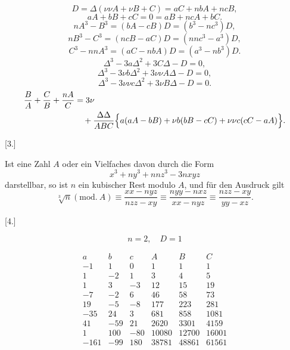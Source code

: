 \[
D = \Delta(\nu\nu A+\nu B+C) = aC+nbA+ncB,
\]
\[
aA+bB+cC = 0 = aB+ncA+bC.
\]
\[
nA^3-B^3 = (bA-cB)D = (b^3-nc^3)D,
\]
\[
nB^3-C^3 = (ncB-aC)D = (nnc^3-a^3)D,
\]
\[
C^3-nnA^3 = (aC-nbA)D = (a^3-nb^3)D.
\]
\[
\Delta^3-3a\Delta^2+3C\Delta-D = 0,
\]
\[
\Delta^3-3\nu b\Delta^2+3\nu\nu A\Delta-D = 0,
\]
\[
\Delta^3-3\nu\nu c\Delta^2+3\nu B\Delta-D = 0.
\]
\[
\begin{aligned}\frac{B}{A} + \frac{C}{B} + \frac{nA}{C} &= 3\nu\\ &\quad + \frac{\Delta\Delta}{ABC}
\Bigl\{a(aA-bB)+\nu b(bB-cC)+\nu\nu c(cC-aA)\Bigr\}.\end{aligned}
\]

\begin{center}[3.]\end{center}\par\noindent\hspace*{\parindent}Ist eine Zahl $A$ oder ein Vielfaches davon durch die Form
\[
x^3+ny^3+nnz^3-3nxyz
\]
\noindent darstellbar, so ist $n$ ein kubischer Rest modulo $A$, und für den Ausdruck gilt
\[
\sqrt[3]{n} (\mathrm{mod.}\ A) \equiv \frac{xx-nyz}{nzz-xy} \equiv \frac{nyy-nxz}{xx-nyz} \equiv
\frac{nzz-xy}{yy-xz}.
\]

\begin{center}[4.]\end{center}

\[n=2,\quad D=1\]

\[
\begin{array}{ccc|ccc}
a & b & c & A & B & C \\
-1 & 1 & 0 & 1 & 1 & 1 \\
1 & -2 & 1 & 3 & 4 & 5 \\
1 & 3 & -3 & 12 & 15 & 19 \\
-7 & -2 & 6 & 46 & 58 & 73 \\
19 & -5 & -8 & 177 & 223 & 281 \\
-35 & 24 & 3 & 681 & 858 & 1081 \\
41 & -59 & 21 & 2620 & 3301 & 4159 \\
1 & 100 & -80 & 10080 & 12700 & 16001 \\
-161 & -99 & 180 & 38781 & 48861 & 61561 \\
\end{array}
\]
